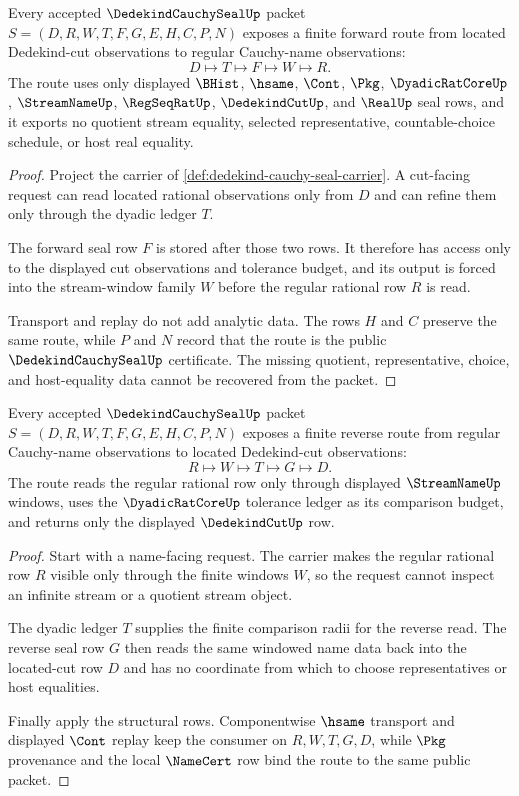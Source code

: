 \begin{theorem}
\label{thm:dedekind-cauchy-seal-forward-regularization}
Every accepted $\DedekindCauchySealUp$ packet $S=(D,R,W,T,F,G,E,H,C,P,N)$ exposes a finite forward route from located Dedekind-cut observations to regular Cauchy-name observations:
$$
D\longmapsto T\longmapsto F\longmapsto W\longmapsto R .
$$
The route uses only displayed $\BHist$, $\hsame$, $\Cont$, $\Pkg$, $\DyadicRatCoreUp$, $\StreamNameUp$, $\RegSeqRatUp$, $\DedekindCutUp$, and $\RealUp$ seal rows, and it exports no quotient stream equality, selected representative, countable-choice schedule, or host real equality.
\end{theorem}
\begin{proof}
Project the carrier of \autoref{def:dedekind-cauchy-seal-carrier}. A cut-facing request can read located rational observations only from $D$ and can refine them only through the dyadic ledger $T$.

The forward seal row $F$ is stored after those two rows. It therefore has access only to the displayed cut observations and tolerance budget, and its output is forced into the stream-window family $W$ before the regular rational row $R$ is read.

Transport and replay do not add analytic data. The rows $H$ and $C$ preserve the same route, while $P$ and $N$ record that the route is the public $\DedekindCauchySealUp$ certificate. The missing quotient, representative, choice, and host-equality data cannot be recovered from the packet.
\end{proof}

\begin{theorem}
\label{thm:dedekind-cauchy-seal-reverse-cut-readback}
Every accepted $\DedekindCauchySealUp$ packet $S=(D,R,W,T,F,G,E,H,C,P,N)$ exposes a finite reverse route from regular Cauchy-name observations to located Dedekind-cut observations:
$$
R\longmapsto W\longmapsto T\longmapsto G\longmapsto D .
$$
The route reads the regular rational row only through displayed $\StreamNameUp$ windows, uses the $\DyadicRatCoreUp$ tolerance ledger as its comparison budget, and returns only the displayed $\DedekindCutUp$ row.
\end{theorem}
\begin{proof}
Start with a name-facing request. The carrier makes the regular rational row $R$ visible only through the finite windows $W$, so the request cannot inspect an infinite stream or a quotient stream object.

The dyadic ledger $T$ supplies the finite comparison radii for the reverse read. The reverse seal row $G$ then reads the same windowed name data back into the located-cut row $D$ and has no coordinate from which to choose representatives or host equalities.

Finally apply the structural rows. Componentwise $\hsame$ transport and displayed $\Cont$ replay keep the consumer on $R,W,T,G,D$, while $\Pkg$ provenance and the local $\NameCert$ row bind the route to the same public packet.
\end{proof}

